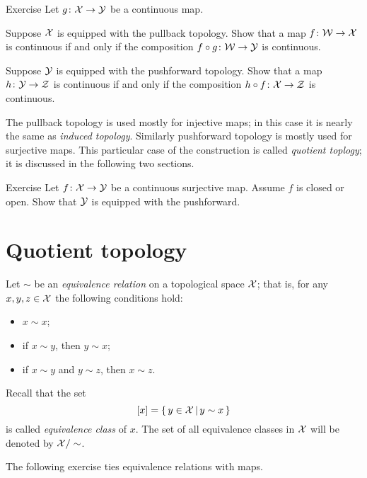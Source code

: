 \begin{thm}{Exercise}
Let $g\colon\mathcal{X}\to\mathcal{Y}$ be a continuous map.

\begin{subthm}{}
Suppose $\mathcal{X}$ is equipped with the pullback topology.
Show that a map $f\colon\mathcal{W}\to\mathcal{X}$ is continuous if and only if the composition $f\circ g\colon\mathcal{W}\to\mathcal{Y}$ is continuous.
\end{subthm}

\begin{subthm}{}
Suppose $\mathcal{Y}$ is equipped with the pushforward topology.
Show that a map $h\colon\mathcal{Y}\to\mathcal{Z}$ is continuous if and only if the composition $h\circ f\colon\mathcal{X}\to\mathcal{Z}$ is continuous.
\end{subthm}

\end{thm}


The pullback topology is used mostly for injective maps; in this case it is nearly the same as \emph{induced topology}.
Similarly pushforward topology is mostly used for surjective maps.
This particular case of the construction is called \emph{quotient toplogy};
it is discussed in the following two sections.

\begin{thm}{Exercise}\label{ex:open-closed-pushforward}
Let $f\colon\mathcal{X}\to \mathcal{Y}$ be a continuous surjective map.
Assume $f$ is closed or open.
Show that $\mathcal{Y}$ is equipped with the pushforward.
\end{thm}

\section{Quotient topology}

Let $\sim$ be an \emph{equivalence relation} on a topological space $\mathcal{X}$;
that is, for any $x,y,z\in\mathcal{X}$ the following conditions hold:
\begin{itemize}
 \item $x\sim x$;
 \item if $x\sim y$, then $y\sim x$;
 \item if $x\sim y$ and $y\sim z$, then $x\sim z$.
\end{itemize}

Recall that the set 
\[[x]=\left\{\,{y\in \mathcal{X}}\,\middle|\,{y\sim x}\,\right\}\]
is called \emph{equivalence class} of $x$.
The set of all equivalence classes in $\mathcal{X}$ will be denoted by $\mathcal{X}/\sim$.

The following exercise ties equivalence relations with maps.


